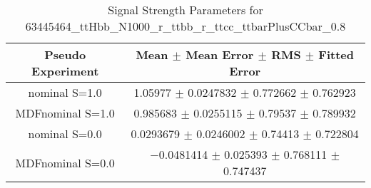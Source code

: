 \begin{table}
\centering
\caption{Signal Strength Parameters for 63445464\_ttHbb\_N1000\_r\_ttbb\_r\_ttcc\_ttbarPlusCCbar\_0.8}
\begin{tabular}{cc}
\toprule
Pseudo Experiment & Mean $\pm$ Mean Error $\pm$ RMS $\pm$ Fitted Error\\
\midrule
nominal S=1.0 & \num{1.05977} $\pm$ \num{0.0247832} $\pm$ \num{0.772662} $\pm$ \num{0.762923}\\
MDFnominal S=1.0 & \num{0.985683} $\pm$ \num{0.0255115} $\pm$ \num{0.79537} $\pm$ \num{0.789932}\\
nominal S=0.0 & \num{0.0293679} $\pm$ \num{0.0246002} $\pm$ \num{0.74413} $\pm$ \num{0.722804}\\
MDFnominal S=0.0 & \num{-0.0481414} $\pm$ \num{0.025393} $\pm$ \num{0.768111} $\pm$ \num{0.747437}\\
\bottomrule
\end{tabular}
\end{table}